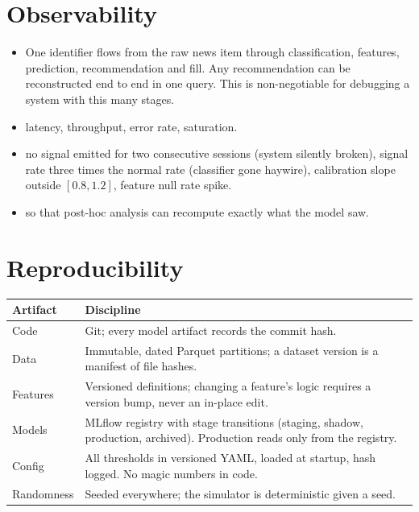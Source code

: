 \section{Observability}

\begin{itemize}
\item {} One identifier flows from the raw news item
through classification, features, prediction, recommendation and fill. Any
recommendation can be reconstructed end to end in one query. This is
non-negotiable for debugging a system with this many stages.
\item {} latency, throughput, error rate,
saturation.
\item {} no signal emitted for two consecutive sessions
(system silently broken), signal rate three times the normal rate (classifier
gone haywire), calibration slope outside $[0.8, 1.2]$, feature null rate spike.
\item {} so that
post-hoc analysis can recompute exactly what the model saw.
\end{itemize}

\section{Reproducibility}

\begin{longtable}{@{}p{3.6cm}p{11.0cm}@{}}
\toprule
\textbf{Artifact} & \textbf{Discipline}\\
\midrule
Code & Git; every model artifact records the commit hash.\\
Data & Immutable, dated Parquet partitions; a dataset version is a manifest of
file hashes.\\
Features & Versioned definitions; changing a feature's logic requires a version
bump, never an in-place edit.\\
Models & MLflow registry with stage transitions (staging, shadow, production,
archived). Production reads only from the registry.\\
Config & All thresholds in versioned YAML, loaded at startup, hash logged.
No magic numbers in code.\\
Randomness & Seeded everywhere; the simulator is deterministic given a seed.\\
\bottomrule
\end{longtable}

